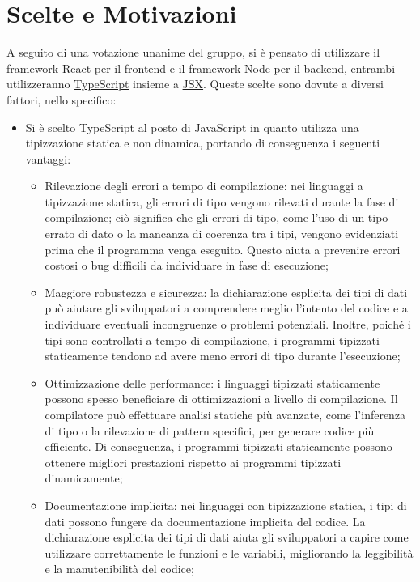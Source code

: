\documentclass[a4paper, 12pt]{article}
\begin{document}
\section{Scelte e Motivazioni}
A seguito di una votazione unanime del gruppo, si è pensato di utilizzare il framework \href{https://react.dev/}{React} per il frontend e il framework \href{https://nodejs.org/}{Node} per il backend, entrambi utilizzeranno \href{https://www.typescriptlang.org/}{TypeScript} insieme a \href{https://www.typescriptlang.org/docs/handbook/jsx.html}{JSX}.
Queste scelte sono dovute a diversi fattori, nello specifico:
\begin{itemize}
    \item Si è scelto TypeScript al posto di JavaScript in quanto utilizza una tipizzazione statica e non dinamica, portando di conseguenza i seguenti vantaggi:
    \begin{itemize}
        \item Rilevazione degli errori a tempo di compilazione: nei linguaggi a tipizzazione statica, gli errori di tipo vengono rilevati durante la fase di compilazione; ciò significa che gli errori di tipo, come l'uso di un tipo errato di dato o la mancanza di coerenza tra i tipi, vengono evidenziati prima che il programma venga eseguito. Questo aiuta a prevenire errori costosi o bug difficili da individuare in fase di esecuzione;
        \item Maggiore robustezza e sicurezza: la dichiarazione esplicita dei tipi di dati può aiutare gli sviluppatori a comprendere meglio l'intento del codice e a individuare eventuali incongruenze o problemi potenziali. Inoltre, poiché i tipi sono controllati a tempo di compilazione, i programmi tipizzati staticamente tendono ad avere meno errori di tipo durante l'esecuzione;
        \item Ottimizzazione delle performance: i linguaggi tipizzati staticamente possono spesso beneficiare di ottimizzazioni a livello di compilazione. Il compilatore può effettuare analisi statiche più avanzate, come l'inferenza di tipo o la rilevazione di pattern specifici, per generare codice più efficiente. Di conseguenza, i programmi tipizzati staticamente possono ottenere migliori prestazioni rispetto ai programmi tipizzati dinamicamente;
        \item Documentazione implicita: nei linguaggi con tipizzazione statica, i tipi di dati possono fungere da documentazione implicita del codice. La dichiarazione esplicita dei tipi di dati aiuta gli sviluppatori a capire come utilizzare correttamente le funzioni e le variabili, migliorando la leggibilità e la manutenibilità del codice;

\end{itemize}
\end{itemize}
\end{document}

